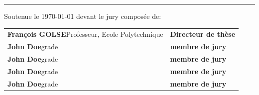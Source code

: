 \begin{titlingpage}
\noindent\rule{\textwidth}{1pt}

\vfill


{
Soutenue le \today {} devant le jury composée de:

\noindent\begin{tabularx}{\textwidth}{X >{\bfseries}l}
\textbf{François GOLSE}\newline Professeur, Ecole Polytechnique& Directeur de thèse\\
\textbf{John Doe}\newline grade& membre de jury\\
\textbf{John Doe}\newline grade& membre de jury\\
\textbf{John Doe}\newline grade& membre de jury\\
\textbf{John Doe}\newline grade& membre de jury\\
\end{tabularx}
}

\end{titlingpage}
